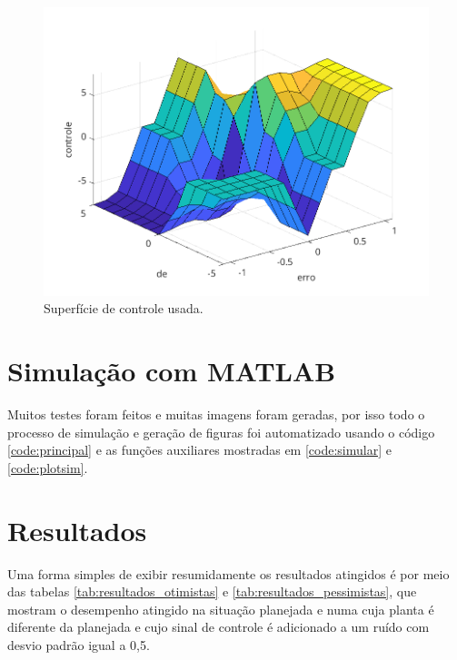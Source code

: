 \documentclass[12pt]{article}
\begin{document}
\begin{figure}
  \centering
  \includegraphics{fig/fuzzy_surface.png}
  \caption{Superfície de controle usada.}
  \label{fig:superficie}
\end{figure}

\section{Simulação com MATLAB}

Muitos testes foram feitos e muitas imagens foram geradas, por isso todo o processo de simulação e geração de figuras foi automatizado usando o código \ref{code:principal} e as funções auxiliares mostradas em \ref{code:simular} e \ref{code:plotsim}.







\section{Resultados}

Uma forma simples de exibir resumidamente os resultados atingidos é por meio das tabelas \ref{tab:resultados_otimistas} e \ref{tab:resultados_pessimistas}, que mostram o desempenho atingido na situação planejada e numa cuja planta é diferente da planejada e cujo sinal de controle é adicionado a um ruído com desvio padrão igual a 0,5.
\end{document}
